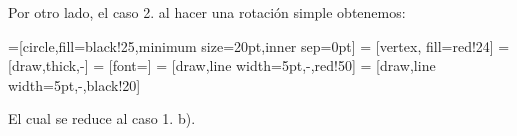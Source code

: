 \documentclass[dcc,sol]{fcfmcourse}
\begin{document}
Por otro lado, el caso 2. al hacer una rotación simple obtenemos: \\
\begin{center}


=[circle,fill=black!25,minimum size=20pt,inner sep=0pt]
 = [vertex, fill=red!24]
 = [draw,thick,-]
 = [font=\small]
 = [draw,line width=5pt,-,red!50]
 = [draw,line width=5pt,-,black!20]


\end{center}
El cual se reduce al caso 1. b).\\
\end{document}
